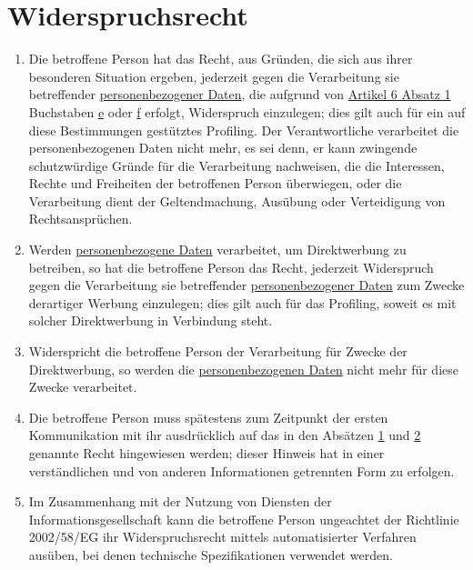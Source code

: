 \chapter{Widerspruchsrecht}
\label{ch:21}


\begin{enumerate}

  \item Die betroffene Person hat das Recht, aus Gründen, die sich aus ihrer besonderen Situation ergeben, jederzeit
   gegen die Verarbeitung sie betreffender \hyperref[itm:04-1]{personenbezogener Daten}, die aufgrund von \hyperref[itm:06-1]{Artikel 6
   Absatz 1} Buchstaben \hyperref[itm:06-1e]{e} oder \hyperref[itm:06-1f]{f} erfolgt, Widerspruch einzulegen; dies gilt
   auch für ein auf diese Bestimmungen gestütztes Profiling. Der Verantwortliche verarbeitet die personenbezogenen
   Daten nicht mehr, es sei denn, er kann zwingende schutzwürdige Gründe für die Verarbeitung nachweisen, die die
   Interessen, Rechte und Freiheiten der betroffenen Person überwiegen, oder die Verarbeitung dient der Geltendmachung,
   Ausübung oder Verteidigung von Rechtsansprüchen.
  \label{itm:21-1}

  \item Werden \hyperref[itm:04-1]{personenbezogene Daten} verarbeitet, um Direktwerbung zu betreiben, so hat die betroffene Person das
   Recht, jederzeit Widerspruch gegen die Verarbeitung sie betreffender \hyperref[itm:04-1]{personenbezogener Daten} zum Zwecke derartiger
   Werbung einzulegen; dies gilt auch für das Profiling, soweit es mit solcher Direktwerbung in Verbindung steht.
  \label{itm:21-2}

  \item Widerspricht die betroffene Person der Verarbeitung für Zwecke der Direktwerbung, so werden die
   \hyperref[itm:04-1]{personenbezogenen Daten} nicht mehr für diese Zwecke verarbeitet.
  \label{itm:21-3}

  \item Die betroffene Person muss spätestens zum Zeitpunkt der ersten Kommunikation mit ihr ausdrücklich auf das in den
   Absätzen \hyperref[itm:21-1]{1} und \hyperref[itm:21-2]{2} genannte Recht hingewiesen werden; dieser Hinweis hat in
   einer verständlichen und von anderen Informationen getrennten Form zu erfolgen.
  \label{itm:21-4}

  \item Im Zusammenhang mit der Nutzung von Diensten der Informationsgesellschaft kann die betroffene Person ungeachtet
   der Richtlinie 2002/58/EG ihr Widerspruchsrecht mittels automatisierter Verfahren ausüben, bei denen technische
   Spezifikationen verwendet werden.
  \label{itm:21-5}


\end{enumerate}
